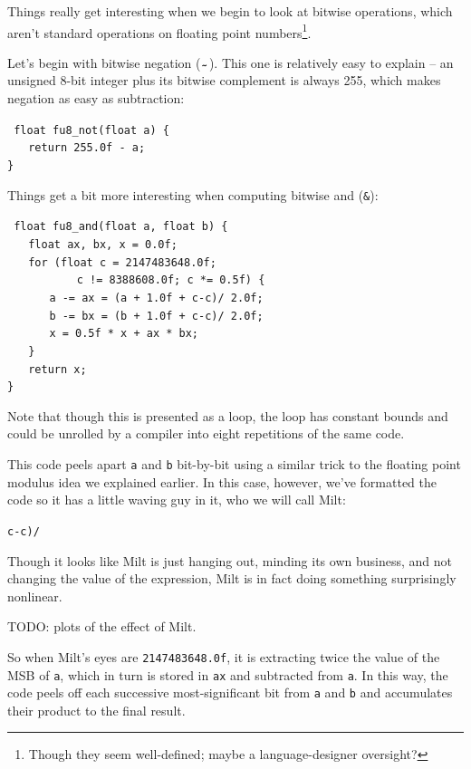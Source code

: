 \documentclass{acmsiggraph}
\theoremstyle{remark}
\theoremstyle{definition}
\begin{document}
Things really get interesting when we begin to look at bitwise operations, which aren't standard operations on floating point numbers\footnote{Though they seem well-defined; maybe a language-designer oversight?}.

Let's begin with bitwise negation (${\tt _{\verb+~+}}$).
This one is relatively easy to explain -- an unsigned 8-bit integer plus its bitwise complement is always 255, which makes negation as easy as subtraction:

{\tt
float fu8\_not(float a) \{ \\
$\phantom{XX}$return 255.0f - a; \\
\}
}

Things get a bit more interesting when computing bitwise and ({\tt \&}):

{\tt
float fu8\_and(float a, float b) \{ \\
$\phantom{XX}$float ax, bx, x = 0.0f; \\
$\phantom{XX}$for (float c = 2147483648.0f;\\
$\phantom{XXXXXX}$ c != 8388608.0f; c *= 0.5f) \{ \\
$\phantom{XXXX}$a -= ax = (a + 1.0f + c-c)/ 2.0f; \\
$\phantom{XXXX}$b -= bx = (b + 1.0f + c-c)/ 2.0f; \\
$\phantom{XXXX}$x = 0.5f * x + ax * bx; \\
$\phantom{XX}$\} \\
$\phantom{XX}$return x; \\
\}
}

Note that though this is presented as a loop, the loop has constant bounds and could be unrolled by a compiler into eight repetitions of the same code.

This code peels apart {\tt a} and {\tt b} bit-by-bit using a similar trick to the floating point modulus idea we explained earlier.
In this case, however, we've formatted the code so it has a little waving guy in it, who we will call Milt:

\begin{center}
\huge
{\tt c-c)/}
\end{center}

Though it looks like Milt is just hanging out, minding its own business, and not changing the value of the expression,
Milt is in fact doing something surprisingly nonlinear.

TODO: plots of the effect of Milt.

So when Milt's eyes are {\tt 2147483648.0f}, it is extracting twice the value of the MSB of {\tt a},
which in turn is stored in {\tt ax} and subtracted from {\tt a}.
In this way, the code peels off each successive most-significant bit from {\tt a} and {\tt b} and accumulates their product to the final result.
\end{document}
